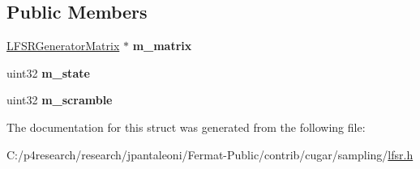 \subsection*{Public Members}
\begin{DoxyCompactItemize}
\item 
\mbox{\label{structcugar_1_1_l_f_s_r_random_stream_ae1f628c733a9bc00e1b8defbfd801d6e}} 
\hyperlink{classcugar_1_1_l_f_s_r_generator_matrix}{L\+F\+S\+R\+Generator\+Matrix} $\ast$ {\bfseries m\+\_\+matrix}
\item 
\mbox{\label{structcugar_1_1_l_f_s_r_random_stream_a989706e7a76a3f61d31e4c51fb4d83eb}} 
uint32 {\bfseries m\+\_\+state}
\item 
\mbox{\label{structcugar_1_1_l_f_s_r_random_stream_a0ce7689c37576066a22526271ce30d85}} 
uint32 {\bfseries m\+\_\+scramble}
\end{DoxyCompactItemize}


The documentation for this struct was generated from the following file\+:\begin{DoxyCompactItemize}
\item 
C\+:/p4research/research/jpantaleoni/\+Fermat-\/\+Public/contrib/cugar/sampling/\hyperlink{lfsr_8h}{lfsr.\+h}\end{DoxyCompactItemize}
